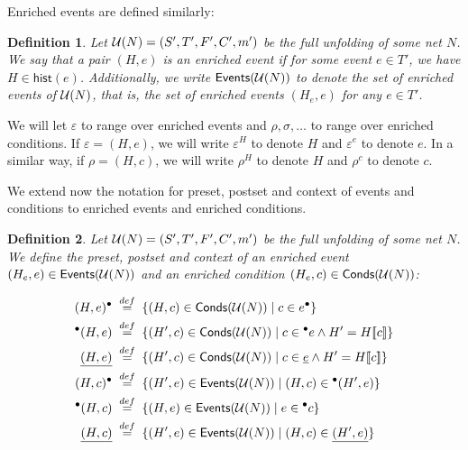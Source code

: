 \documentclass{article}
\newtheorem{definition}{Definition}
\newcommand{\hist}[1]{\ensuremath{\mathsf{hist}(#1)}}
\newcommand{\conds}[1]{\ensuremath{\mathsf{Conds}(#1)}}
\newcommand{\events}[1]{\ensuremath{\mathsf{Events}(#1)}}
\begin{document}
Enriched events are defined similarly:

\begin{definition}
Let $\mathcal{U}(N) = (S', T', F', C', m')$ be the full unfolding of some net $N$.  We
say that a pair $(H, e)$ is an \emph{enriched event} if for some event $e \in
T'$, we have $H \in \hist{e}$.  Additionally, we write $\events{\unf{N}}$ to
denote the set of enriched events of $\mathcal{U}(N)$, that is, the set of enriched
events $(H_e, e)$ for any $e \in T'$.
\end{definition}

We will let $\varepsilon$ to range over enriched events and $\rho, \sigma,
\ldots$ to range over enriched conditions.  If $\varepsilon = (H, e)$, we will
write $\varepsilon^H$ to denote $H$ and $\varepsilon^e$ to denote $e$.  In a
similar way, if $\rho = (H, c)$, we will write $\rho^H$ to denote $H$ and
$\rho^c$ to denote $c$.

  We extend now the notation for preset,
postset and context of events and conditions to enriched events and enriched
conditions.

\begin{definition}
Let $\mathcal{U}(N) = (S', T', F', C', m')$ be the full unfolding of some net $N$.  We
define the \emph{preset}, \emph{postset} and \emph{context} of an enriched
event $(H_e, e) \in \events{\unf N}$ and an enriched condition $(H_e, c) \in
\conds{\unf N}$:

\begin{align*}
\post{(H, e)} & \; \bydef = \; \{ (H, c) \in \conds{\unf N} \mid c \in \post e
\} \\
\pre{(H, e)} & \; \bydef = \; \{ (H', c) \in \conds{\unf N} \mid c \in \pre e
\land H' = H \sem c \} \\
\cont{(H, e)} & \; \bydef = \; \{ (H', c) \in \conds{\unf N} \mid c \in \cont e
\land H' = H \sem c \} \\
\post{(H, c)} & \; \bydef = \; \{ (H', e) \in \events{\unf N} \mid (H, c) \in
\pre{(H', e)} \} \\
\pre{(H, c)} & \; \bydef = \; \{ (H, e) \in \events{\unf N} \mid e \in \pre c
\} \\
\cont{(H, c)} & \; \bydef = \; \{ (H', e) \in \events{\unf N} \mid (H, c) \in
\cont{(H', e)} \} \\
\end{align*}
\end{definition}
\end{document}
